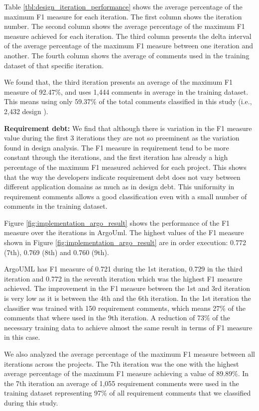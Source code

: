 Table \ref{tbl:design_iteration_performance} shows the average percentage of the maximum F1 measure for each iteration. The first column shows the iteration number. The second column shows the average percentage of the maximum F1 measure achieved for each iteration. The third column presents the delta interval of the average percentage of the maximum F1 measure between one iteration and another. The fourth column shows the average of comments used in the training dataset of that specific iteration.

We found that, the third iteration presents an average of the maximum F1 measure of 92.47\%, and uses 1,444 comments in average in the training dataset. This means using only 59.37\% of the total comments classified in this study (i.e., 2,432 design \SATD). 

\vspace{1mm}
\noindent \textbf{Requirement debt:} We find that although there is variation in the F1 measure value during the first 3 iterations they are not so preeminent as the variation found in design \SATD analysis. The F1 measure in requirement \SATD tend to be more constant through the iterations, and the first iteration has already a high percentage of the maximum F1 measured achieved for each project. This shows that the way the developers indicate requirement debt does not vary between different application domains as much as in design debt. This uniformity in requirement \SATD comments allows a good classification even with a small number of comments in the training dataset.  

Figure \ref{fig:implementation_argo_result} shows the performance of the F1 measure over the iterations in ArgoUml. The highest values of the F1 measure shown in Figure \ref{fig:implementation_argo_result} are in order execution: 0.772 (7th), 0.769 (8th) and 0.760 (9th).

ArgoUML has F1 measure of 0.721 during the 1st iteration, 0.729 in the third iteration and 0.772 in the seventh iteration which was the highest F1 measure achieved. The improvement in the F1 measure between the 1st and 3rd iteration is very low as it is between the 4th and the 6th iteration. In the 1st iteration the classifier was trained with 150 requirement \SATD comments, which means 27\% of the comments that where used in the 9th iteration. A reduction of 73\% of the necessary training data to achieve almost the same result in terms of F1 measure in this case. 

We also analyzed the average percentage of the maximum F1 measure between all iterations across the projects. The 7th iteration was the one with the highest average percentage of the maximum F1 measure achieving a value of 89.89\%. In the 7th iteration an average of 1,055 requirement \SATD comments were used in the training dataset representing 97\% of all requirement \SATD comments that we classified during this study.


